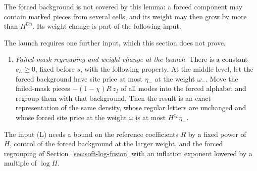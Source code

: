 The forced background is not covered by this lemma: a forced component
may contain marked pieces from several cells, and its weight may then
grow by more than $H^{Un}$. Its weight change is part of the following
input.

The launch requires one further input, which this section does not prove.
\begin{enumerate}
\item[(L)] \emph{Failed-mask regrouping and weight change at the launch.}
 There is a constant $c_L\ge0$, fixed before $s$, with the following
 property. At the middle level, let the forced background have site price
 at most $\eta_-$ at the weight $\omega_-$. Move the failed-mask pieces
 $-(1-\chi)R\,z_I$ of all modes into the forced alphabet and regroup them
 with that background. Then the result is an exact representation of the
 same density, whose regular letters are unchanged and whose forced site
 price at the weight $\omega$ is at most $H^{c_L}\eta_-$.
\end{enumerate}
The input (L) needs a bound on the reference coefficients $R$ by a fixed
power of $H$, control of the forced background at the larger weight, and
the forced regrouping of Section~\ref{sec:soft-log-fusion} with an
inflation exponent lowered by a multiple of $\log H$.

